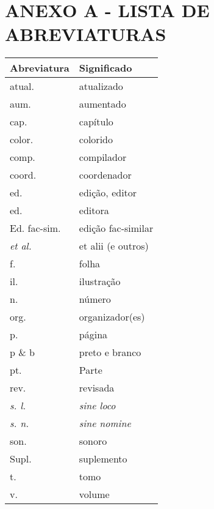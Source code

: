 \section*{\centering ANEXO A - LISTA DE ABREVIATURAS}
\vspace{1 cm}

\normalsize

\centering
\begin{tabular}{|l|l|}
\hline
\textbf{Abreviatura} & \textbf{Significado} \\ \hline
atual.               & atualizado           \\ \hline
aum.                 & aumentado            \\ \hline
cap.                 & capítulo             \\ \hline
color.               & colorido             \\ \hline
comp.                & compilador           \\ \hline
coord.               & coordenador          \\ \hline
ed.                  & edição, editor       \\ \hline
ed.                  & editora              \\ \hline
Ed. fac-sim.         & edição fac-similar   \\ \hline
\textit{et al.}      & et alii (e outros)   \\ \hline
f.                   & folha                \\ \hline
il.                  & ilustração           \\ \hline
n.                   & número               \\ \hline
org.                 & organizador(es)      \\ \hline
p.                   & página               \\ \hline
p \& b               & preto e branco       \\ \hline
pt.                  & Parte                \\ \hline
rev.                 & revisada             \\ \hline
\textit{s. l.}       & \textit{sine loco}   \\ \hline
\textit{s. n.}       & \textit{sine nomine} \\ \hline
son.                 & sonoro               \\ \hline
Supl.                & suplemento           \\ \hline
t.                   & tomo                 \\ \hline
v.                   & volume               \\ \hline
\end{tabular}

